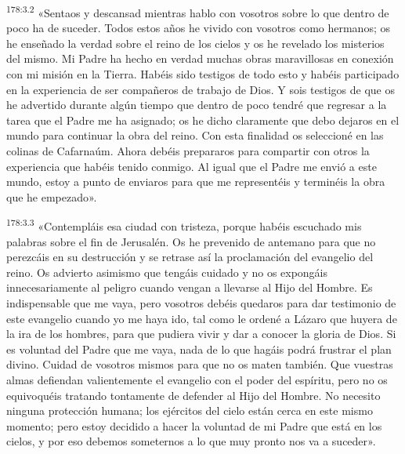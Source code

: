 \par 
\textsuperscript{178:3.2} «Sentaos y descansad mientras hablo con vosotros sobre lo que dentro de poco ha de suceder. Todos estos años he vivido con vosotros como hermanos; os he enseñado la verdad sobre el reino de los cielos y os he revelado los misterios del mismo. Mi Padre ha hecho en verdad muchas obras maravillosas en conexión con mi misión en la Tierra. Habéis sido testigos de todo esto y habéis participado en la experiencia de ser compañeros de trabajo de Dios. Y sois testigos de que os he advertido durante algún tiempo que dentro de poco tendré que regresar a la tarea que el Padre me ha asignado; os he dicho claramente que debo dejaros en el mundo para continuar la obra del reino. Con esta finalidad os seleccioné en las colinas de Cafarnaúm. Ahora debéis prepararos para compartir con otros la experiencia que habéis tenido conmigo. Al igual que el Padre me envió a este mundo, estoy a punto de enviaros para que me representéis y terminéis la obra que he empezado».

\par 
\textsuperscript{178:3.3} «Contempláis esa ciudad con tristeza, porque habéis escuchado mis palabras sobre el fin de Jerusalén. Os he prevenido de antemano para que no perezcáis en su destrucción y se retrase así la proclamación del evangelio del reino. Os advierto asimismo que tengáis cuidado y no os expongáis innecesariamente al peligro cuando vengan a llevarse al Hijo del Hombre. Es indispensable que me vaya, pero vosotros debéis quedaros para dar testimonio de este evangelio cuando yo me haya ido, tal como le ordené a Lázaro que huyera de la ira de los hombres, para que pudiera vivir y dar a conocer la gloria de Dios. Si es voluntad del Padre que me vaya, nada de lo que hagáis podrá frustrar el plan divino. Cuidad de vosotros mismos para que no os maten también. Que vuestras almas defiendan valientemente el evangelio con el poder del espíritu, pero no os equivoquéis tratando tontamente de defender al Hijo del Hombre. No necesito ninguna protección humana; los ejércitos del cielo están cerca en este mismo momento; pero estoy decidido a hacer la voluntad de mi Padre que está en los cielos, y por eso debemos someternos a lo que muy pronto nos va a suceder».

